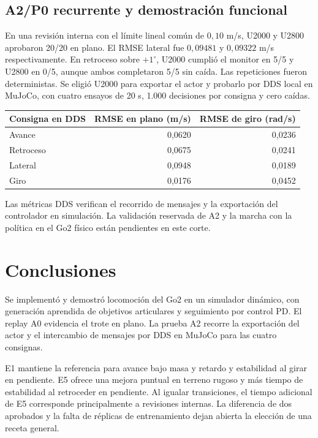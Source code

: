 \documentclass[11pt]{article}
\begin{document}
\subsection{A2/P0 recurrente y demostración funcional}
En una revisión interna con el límite lineal común de \(0{,}10\) m/s, U2000 y U2800 aprobaron 20/20 en plano. El RMSE lateral fue \(0{,}09481\) y \(0{,}09322\) m/s respectivamente. En retroceso sobre \(+1^\circ\), U2000 cumplió el monitor en 5/5 y U2800 en 0/5, aunque ambos completaron 5/5 sin caída. Las repeticiones fueron deterministas. Se eligió U2000 para exportar el actor y probarlo por DDS local en MuJoCo, con cuatro ensayos de 20 s, 1.000 decisiones por consigna y cero caídas.

\begin{tabularx}{\linewidth}{@{}Lrr@{}}
\toprule
\textbf{Consigna en DDS} & \textbf{RMSE en plano (m/s)} & \textbf{RMSE de giro (rad/s)}\\
\midrule
Avance & 0,0620 & 0,0236\\
Retroceso & 0,0675 & 0,0241\\
Lateral & 0,0948 & 0,0189\\
Giro & 0,0176 & 0,0452\\
\bottomrule
\end{tabularx}

\medskip
Las métricas DDS verifican el recorrido de mensajes y la exportación del controlador en simulación. La validación reservada de A2 y la marcha con la política en el Go2 físico están pendientes en este corte.

\newpage
\section{Conclusiones}
Se implementó y demostró locomoción del Go2 en un simulador dinámico, con generación aprendida de objetivos articulares y seguimiento por control PD. El replay A0 evidencia el trote en plano. La prueba A2 recorre la exportación del actor y el intercambio de mensajes por DDS en MuJoCo para las cuatro consignas.

E1 mantiene la referencia para avance bajo masa y retardo y estabilidad al girar en pendiente. E5 ofrece una mejora puntual en terreno rugoso y más tiempo de estabilidad al retroceder en pendiente. Al igualar transiciones, el tiempo adicional de E5 corresponde principalmente a revisiones internas. La diferencia de dos aprobados y la falta de réplicas de entrenamiento dejan abierta la elección de una receta general.
\end{document}
